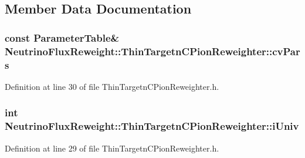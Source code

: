 \subsection{Member Data Documentation}
\hypertarget{class_neutrino_flux_reweight_1_1_thin_targetn_c_pion_reweighter_ab843f2f08ded4f483a4f80f9ee3488ed}{
\subsubsection[{cv\-Pars}]{\setlength{\rightskip}{0pt plus 5cm}const {\bf Parameter\-Table}\& Neutrino\-Flux\-Reweight\-::\-Thin\-Targetn\-C\-Pion\-Reweighter\-::cv\-Pars\hspace{0.3cm}{\ttfamily [private]}}}\label{class_neutrino_flux_reweight_1_1_thin_targetn_c_pion_reweighter_ab843f2f08ded4f483a4f80f9ee3488ed}


Definition at line 30 of file Thin\-Targetn\-C\-Pion\-Reweighter.\-h.

\hypertarget{class_neutrino_flux_reweight_1_1_thin_targetn_c_pion_reweighter_a4739c4b376e4e9d4a1b6968efddf41d8}{
\subsubsection[{i\-Univ}]{\setlength{\rightskip}{0pt plus 5cm}int Neutrino\-Flux\-Reweight\-::\-Thin\-Targetn\-C\-Pion\-Reweighter\-::i\-Univ\hspace{0.3cm}{\ttfamily [private]}}}\label{class_neutrino_flux_reweight_1_1_thin_targetn_c_pion_reweighter_a4739c4b376e4e9d4a1b6968efddf41d8}


Definition at line 29 of file Thin\-Targetn\-C\-Pion\-Reweighter.\-h.

